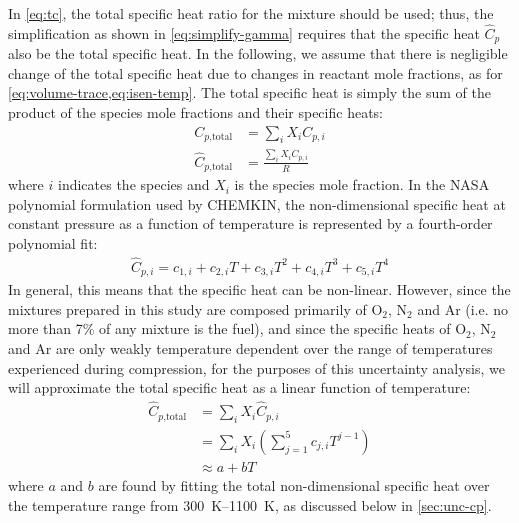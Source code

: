 \documentclass[../main.tex]{subfiles}
\begin{document}
In \cref{eq:tc}, the total specific heat ratio for the mixture
should be used; thus, the simplification as shown in \cref{eq:simplify-gamma}
requires that the specific heat $\hat{C}_p$ also be the total specific
heat. In the following, we assume that there is negligible
change of the total specific heat due to changes in reactant
mole fractions, as for \cref{eq:volume-trace,eq:isen-temp}.
The total specific heat is simply the sum of the product of
the species mole fractions and their specific heats:
%
\begin{subequations}
\label{eq:cp}
\begin{align}
C_{p\text{,total}} &= \sum_i X_i C_{p,i} \\
\hat{C}_{p\text{,total}} &= \frac{\sum_i X_i C_{p,i}}{R}
\end{align}
\end{subequations}
%
where $i$ indicates the species and $X_i$ is the species mole fraction.
In the NASA polynomial formulation used by CHEMKIN, the non-dimensional specific
heat at constant pressure as a function of temperature is represented by a
fourth-order polynomial fit:
%
\begin{align}
\label{eq:cp-nasa}
\hat{C}_{p,i} = c_{1,i} + c_{2,i} T + c_{3,i} T^2 + c_{4,i} T^3 + c_{5,i} T^4
\end{align}
%
In general, this means that the specific heat can be non-linear. However,
since the mixtures prepared in this study are composed primarily of
O$_2$, N$_2$ and Ar (i.e. no more than 7\% of any mixture is the
fuel), and since the specific heats of O$_2$, N$_2$ and Ar are only weakly
temperature dependent over the range of temperatures experienced during
compression, for the purposes of this uncertainty analysis, we will
approximate the total specific heat as a linear function of temperature:
%
\begin{equation}
\label{eq:cp-total}
\begin{split}
\hat{C}_{p\text{,total}} &= \sum_i X_i \hat{C}_{p,i} \\
&= \sum_i X_i \left( \sum_{j=1}^5 c_{j,i} T^{j-1} \right) \\
&\approx a + b T
\end{split}
\end{equation}
%
where $a$ and $b$ are found by fitting the total non-dimensional specific heat
over the temperature range from \SIrange{300}{1100}{\kelvin}, as
discussed below in \cref{sec:unc-cp}.
\end{document}
